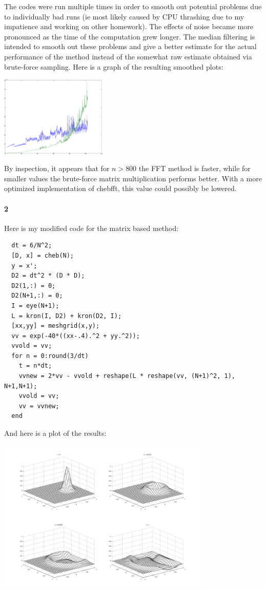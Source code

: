 \documentclass{article}
\begin{document}
The codes were run multiple times in order to smooth out potential problems due to individually bad runs (ie most likely caused by CPU thrashing due to my impatience and working on other homework).  The effects of noise became more pronounced as the time of the computation grew longer.  The median filtering is intended to smooth out these problems and give a better estimate for the actual performance of the method instead of the somewhat raw estimate obtained via brute-force sampling.  Here is a graph of the resulting smoothed plots:

\begin{center}
\includegraphics[width=2in]{plot1.png}
\end{center}

By inspection, it appears that for $n > 800$ the FFT method is faster, while for smaller values the brute-force matrix multiplication performs better.  With a more optimized implementation of chebfft, this value could possibly be lowered.

\paragraph{2}  
Here is my modified code for the matrix based method:

\begin{verbatim}
  dt = 6/N^2;
  [D, x] = cheb(N);
  y = x';
  D2 = dt^2 * (D * D);
  D2(1,:) = 0;
  D2(N+1,:) = 0;
  I = eye(N+1);
  L = kron(I, D2) + kron(D2, I);  
  [xx,yy] = meshgrid(x,y);
  vv = exp(-40*((xx-.4).^2 + yy.^2));
  vvold = vv; 
  for n = 0:round(3/dt)
    t = n*dt;
    vvnew = 2*vv - vvold + reshape(L * reshape(vv, (N+1)^2, 1), N+1,N+1);
    vvold = vv; 
    vv = vvnew;
  end
\end{verbatim}

And here is a plot of the results:

\begin{center}
\includegraphics[width=4in]{plot3.png}
\end{center}
\end{document}
